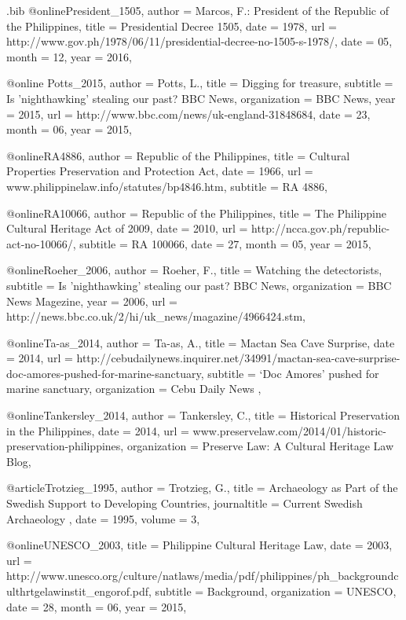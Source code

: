 \begin{filecontents}{\IJSRAidentifier.bib}
@online{President_1505,
	author = {Marcos, F.: President of the Republic of the Philippines},
	title = {Presidential Decree 1505},
	date = {1978},
	url = {http://www.gov.ph/1978/06/11/presidential-decree-no-1505-s-1978/},
	date = {05},
	month = {12},
	year = {2016},
}

@online {Potts_2015,
	author = {Potts, L.},
	title  = {Digging for treasure},
	subtitle = {Is 'nighthawking' stealing our past? BBC News},
	organization = {BBC News},
	year   = {2015},
	url    = {http://www.bbc.com/news/uk-england-31848684},
	date = {23},
	month = {06},
	year = {2015},
}


@online{RA4886,
	author = {Republic of the Philippines},
	title = {Cultural Properties Preservation and Protection Act},
	date = {1966},
	url = {www.philippinelaw.info/statutes/bp4846.htm},
	subtitle = {RA 4886},
}

@online{RA10066,
	author = {Republic of the Philippines},
	title = {The Philippine Cultural Heritage Act of 2009},
	date = {2010},
	url = {http://ncca.gov.ph/republic-act-no-10066/},
	subtitle = {RA 100066},
	date = {27},
	month = {05},
	year = {2015},	
}

@online{Roeher_2006,
	author = {Roeher, F.},
	title  = {Watching the detectorists},
	subtitle = {Is 'nighthawking' stealing our past? BBC News},
	organization = {BBC News Magezine},
	year   = {2006},
	url    = {http://news.bbc.co.uk/2/hi/uk_news/magazine/4966424.stm},
}

@online{Ta-as_2014,
	author = {Ta-as, A.},
	title = {Mactan Sea Cave Surprise},
	date = {2014},
	url = {http://cebudailynews.inquirer.net/34991/mactan-sea-cave-surprise-doc-amores-pushed-for-marine-sanctuary},
	subtitle = {‘Doc Amores’ pushed for marine sanctuary},
	organization = {Cebu Daily News },
}

@online{Tankersley_2014,
	author = {Tankersley, C.},
	title = {Historical Preservation in the Philippines},
	date = {2014},
	url = {www.preservelaw.com/2014/01/historic-preservation-philippines},
	organization = {Preserve Law: A Cultural Heritage Law Blog},
}

@article{Trotzieg_1995,
	author = {Trotzieg, G.},
	title = {Archaeology as Part of the Swedish Support to Developing Countries},
	journaltitle = {Current Swedish Archaeology },
	date = {1995},
	volume = {3},
}

@online{UNESCO_2003,
	title = {Philippine Cultural Heritage Law},
	date = {2003},
	url = {http://www.unesco.org/culture/natlaws/media/pdf/philippines/ph_backgroundculthrtgelawinstit_engorof.pdf},
	subtitle = {Background},
	organization = {UNESCO},
	date = {28},
	month = {06},
	year = {2015},
}


\end{filecontents}
